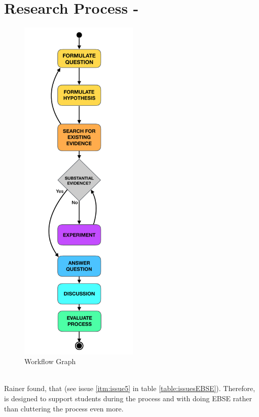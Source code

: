 
\section{Research Process - \checklist}
\label{sec:research process}

\begin{minipage}{\linewidth}
\begin{figure}
	\centering
	\vspace{1cm}
	\includegraphics[trim={3cm 0 3cm 0}, height=17cm]{figures/workflow_graph.pdf}
	\caption{Workflow Graph}
	\label{fig:workflow_graph}
\end{figure}



\\
Rainer \etal found, that  \cite{Rainer2006} (see issue \ref{itm:issue5} in table \ref{table:issuesEBSE}). Therefore, \checklist is designed to support students during the process and with doing  EBSE rather than cluttering the process even more.


\end{minipage}

